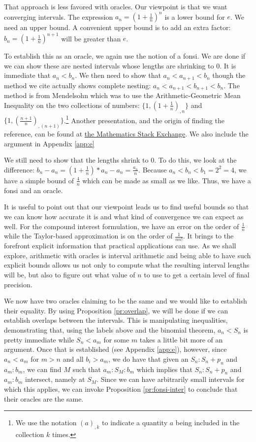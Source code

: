 \documentclass[12pt]{article}
\theoremstyle{remark}
\begin{document}
That approach is less favored with oracles. Our viewpoint is that we want converging intervals. The expression $a_n = (1+\frac{1}{n})^n$ is a lower bound for $e$. We need an upper bound. A convenient upper bound is to add an extra factor: $b_n = (1+\frac{1}{n})^{n+1}$ will be greater than $e$. 

To establish this as an oracle, we again use the notion of a fonsi. We are done if we can show these are nested intervals whose lengths are shrinking to 0. It is immediate that $a_n < b_n$. We then need to show that $a_n < a_{n+1} < b_n$ though the method we cite actually shows complete nesting: $a_n < a_{n+1} < b_{n+1} < b_n$. The method is from Mendelsohn \cite{mend} which was to use the Arithmetic-Geometric Mean Inequality on the two collections of numbers: $\{1, (1+ \frac{1}{n})_{,n} \}$ and $\{1, (\frac{n+1}{n})_{,(n+1)}\}$.\footnote{We use the notation $(a)_{,k}$ to indicate a quantity $a$ being included in the collection $k$ times.} Another presentation, and the origin of finding the reference, can be found at \href{https://math.stackexchange.com/questions/389793/what-is-the-most-elementary-proof-that-lim-n-to-infty-11-nn-exists}{the Mathematics Stack Exchange}. We also include the argument in Appendix \ref{app:e}

We still need to show that the lengths shrink to 0. To do this, we look at the difference: $b_n - a_n = (1+\tfrac{1}{n})*a_n - a_n = \tfrac{a_n}{n}$. Because $a_n < b_n < b_1=2^2 = 4$, we have a simple bound of $\tfrac{4}{n}$ which can be made as small as we like. Thus, we have a fonsi and an oracle. 

It is useful to point out that our viewpoint leads us to find useful bounds so that we can know how accurate it is and what kind of convergence we can expect as well. For the compound interest formulation, we have an error on the order of $\frac{1}{n}$ while the Taylor-based approximation is on the order of $\frac{1}{n n!}$. It brings to the forefront explicit information that practical applications can use. As we shall explore, arithmetic with oracles is interval arithmetic and being able to have such explicit bounds allows us not only to compute what the resulting interval lengths will be, but also to figure out what value of $n$ to use to get a certain level of final precision. 

We now have two oracles claiming to be the same and we would like to establish their equality. By using Proposition \ref{pr:overlap}, we will be done if we can establish overlaps between the intervals. This is manipulating inequalities, demonstrating that, using the labels above and the binomial theorem,  $a_n < S_n$ is pretty immediate while $S_n < a_m$ for some $m$ takes a little bit more of an argument. Once that is established (see Appendix \ref{app:e}), however, since $a_n < a_m$ for $m>n$ and all $b_i > a_m$, we do have that given an $S_n:S_n+p_n$ and $a_m:b_m$, we can find $M$ such that $a_m : S_M : b_m$ which implies that $S_n:S_n+p_n$ and $a_m:b_m$ intersect, namely at $S_M$. Since we can have arbitrarily small intervals for which this applies, we can invoke Proposition \ref{pr:fonsi-inter} to conclude that their oracles are the same. 
\end{document}
